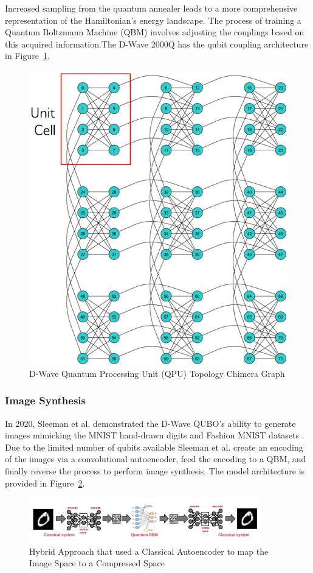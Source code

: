 \documentclass[%
 reprint,
 amsmath,amssymb,
 aps,
]{revtex4-2}
\begin{document}
Increased sampling from the quantum annealer leads to a more comprehensive representation of the Hamiltonian's energy landscape. The process of training a Quantum Boltzmann Machine (QBM) involves adjusting the couplings based on this acquired information.The D-Wave 2000Q has the qubit coupling architecture in Figure~\ref{fig:chimera}.

\begin{figure}[h]
    \includegraphics[width=0.7\columnwidth]{chimera.png}
    \caption{\label{fig:chimera} D-Wave Quantum Processing Unit (QPU) Topology Chimera Graph \cite{dwavedocs}}
\end{figure}

\subsubsection{Image Synthesis}
In 2020, Sleeman et al. demonstrated the D-Wave QUBO's ability to generate images mimicking the MNIST hand-drawn digits and Fashion MNIST datasets \cite{qmlimggen}. Due to the limited number of qubits available Sleeman et al. create an encoding of the images via a convolutional autoencoder, feed the encoding to a QBM, and finally reverse the process to perform image synthesis. The model architecture is provided in Figure~\ref{fig:hybridML}.

\begin{figure}
    \includegraphics[width=0.9\textwidth]{qmlimgimg.png}
    \caption{\label{fig:hybridML} Hybrid Approach that used a Classical Autoencoder to map the Image Space to a Compressed Space \cite{qmlimggen}}
\end{figure}
\end{document}
